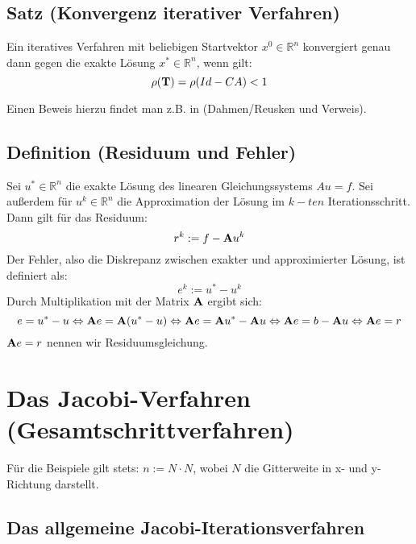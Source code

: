 \subsection{Satz (Konvergenz iterativer Verfahren)}\label{ss.Konvergenz iterativer Verfahren}

Ein iteratives Verfahren mit beliebigen Startvektor $x^{0} \in \mathbb{R}^{n}$ konvergiert genau dann gegen die exakte Lösung $x^{*} \in \mathbb{R}^{n}$, wenn gilt:
\begin{equation}
\rho({\textbf{T}}) = \rho(Id - CA) < 1
\end{equation}

Einen Beweis hierzu findet man z.B. in (Dahmen/Reusken und Verweis).

\subsection{Definition (Residuum und Fehler)}\label{ss.Residuum und Fehler}

Sei $u^{*} \in \mathbb{R}^{n}$ die exakte Lösung des linearen Gleichungssystems $Au = f$. Sei außerdem für $u^{k} \in \mathbb{R}^{n}$ die Approximation der Lösung im $k-ten$ Iterationsschritt. Dann gilt für das Residuum:
\begin{equation}
r^{k} := f - {\textbf{A}} u^{k}\label{eq.Residuum}
\end{equation}
Der Fehler, also die Diskrepanz zwischen exakter und approximierter Lösung, ist definiert als:
\begin{equation}
e^{k} := u^{*} - u^{k}\label{eq.Fehler}
\end{equation}
Durch Multiplikation mit der Matrix ${\textbf{A}}$ ergibt sich:
\begin{equation}
e = u^{*} - u \Leftrightarrow {\textbf{A}}e = {\textbf{A}}(u^{*} - u) \Leftrightarrow {\textbf{A}}e = {\textbf{A}} u^{*} - {\textbf{A}} u \Leftrightarrow {\textbf{A}}e = b - {\textbf{A}} u \Leftrightarrow {\textbf{A}}e = r
\end{equation}
${\textbf{A}}e = r$ nennen wir Residuumsgleichung.

\section{Das Jacobi-Verfahren (Gesamtschrittverfahren)}\label{s.Das Jacobi-Iterationsverfahren}

Für die Beispiele gilt stets: $n := N \cdot N$, wobei $N$ die Gitterweite in x- und y-Richtung darstellt.

\subsection{Das allgemeine Jacobi-Iterationsverfahren}\label{ss.Allgemeines Jacobi-Verfahren}

